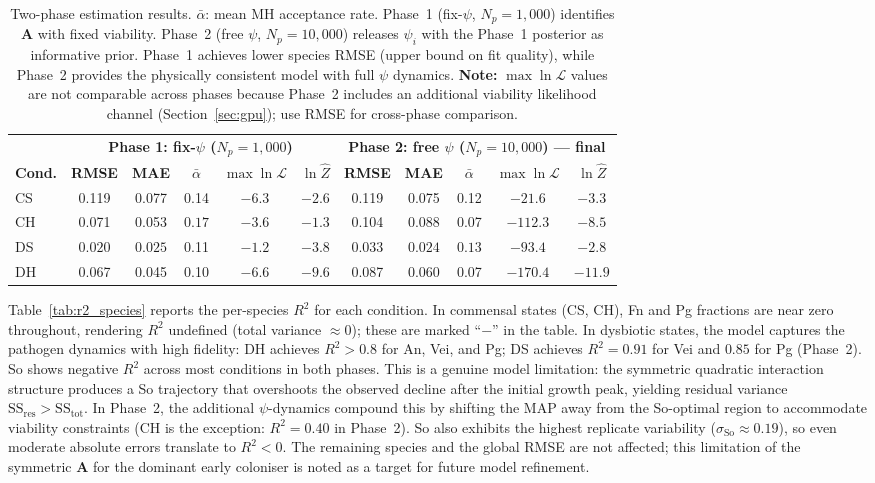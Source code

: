 \documentclass[11pt,a4paper]{article}
\begin{document}
\begin{table}[htbp]
\centering\small
\begin{tabular}{@{}l ccccc ccccc@{}}
\toprule
& \multicolumn{5}{c}{\textbf{Phase 1: fix-$\psi$ ($N_p\!=\!1{,}000$)}} & \multicolumn{5}{c}{\textbf{Phase 2: free $\psi$ ($N_p\!=\!10{,}000$) --- final}}\\
\cmidrule(lr){2-6}\cmidrule(lr){7-11}
\textbf{Cond.} & \textbf{RMSE} & \textbf{MAE} & $\bar{\alpha}$ & $\max\ln\mathcal{L}$ & $\ln\hat{Z}$ & \textbf{RMSE} & \textbf{MAE} & $\bar{\alpha}$ & $\max\ln\mathcal{L}$ & $\ln\hat{Z}$\\
\midrule
CS  & 0.119 & 0.077 & 0.14 & $-6.3$ & $-2.6$ & 0.119 & 0.075 & 0.12 & $-21.6$ & $-3.3$\\
CH  & 0.071 & 0.053 & $\mathbf{0.17}$ & $-3.6$ & $\mathbf{-1.3}$ & 0.104 & 0.088 & 0.07 & $-112.3$ & $-8.5$\\
DS  & $\mathbf{0.020}$ & $\mathbf{0.025}$ & 0.11 & $\mathbf{-1.2}$ & $-3.8$ & $\mathbf{0.033}$ & $\mathbf{0.024}$ & $\mathbf{0.13}$ & $-93.4$ & $\mathbf{-2.8}$\\
DH  & 0.067 & 0.045 & 0.10 & $-6.6$ & $-9.6$ & 0.087 & 0.060 & 0.07 & $-170.4$ & $-11.9$\\
\bottomrule
\end{tabular}
\caption{Two-phase estimation results.
$\bar{\alpha}$: mean MH acceptance rate.
Phase~1 (fix-$\psi$, $N_p=1{,}000$) identifies $\mathbf{A}$ with fixed viability.
Phase~2 (free $\psi$, $N_p=10{,}000$) releases $\psi_i$ with the Phase~1 posterior as informative prior.
Phase~1 achieves lower species RMSE (upper bound on fit quality), while Phase~2 provides the physically consistent model with full $\psi$ dynamics.
\textbf{Note:} $\max\ln\mathcal{L}$ values are not comparable across phases because Phase~2 includes an additional viability likelihood channel (Section~\ref{sec:gpu}); use RMSE for cross-phase comparison.}
\label{tab:rmse}
\end{table}

Table~\ref{tab:r2_species} reports the per-species $R^2$ for each condition.
In commensal states (CS, CH), Fn and Pg fractions are near zero throughout, rendering $R^2$ undefined (total variance $\approx0$); these are marked ``$-$'' in the table.
In dysbiotic states, the model captures the pathogen dynamics with high fidelity: DH achieves $R^2>0.8$ for An, Vei, and Pg; DS achieves $R^2=0.91$ for Vei and $0.85$ for Pg (Phase~2).
So shows negative $R^2$ across most conditions in both phases.
This is a genuine model limitation: the symmetric quadratic interaction structure produces a So trajectory that overshoots the observed decline after the initial growth peak, yielding residual variance $\mathrm{SS}_{\mathrm{res}} > \mathrm{SS}_{\mathrm{tot}}$.
In Phase~2, the additional $\psi$-dynamics compound this by shifting the MAP away from the So-optimal region to accommodate viability constraints (CH is the exception: $R^2=0.40$ in Phase~2).
So also exhibits the highest replicate variability ($\sigma_{\mathrm{So}}\approx0.19$), so even moderate absolute errors translate to $R^2<0$.
The remaining species and the global RMSE are not affected; this limitation of the symmetric $\mathbf{A}$ for the dominant early coloniser is noted as a target for future model refinement.
\end{document}
